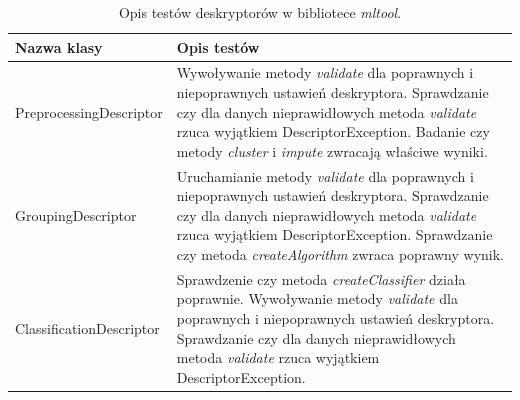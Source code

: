 \documentclass[../thesis.tex]{subfiles}
\begin{document}
\begin{table}[h]
\begin{center}
\begin{tabular}{ | l | p{110mm} | }
\hline
\rowcolor{lightgray} Nazwa klasy & Opis testów \\\hline

PreprocessingDescriptor & Wywoływanie metody \emph{validate} dla poprawnych i niepoprawnych ustawień deskryptora. Sprawdzanie czy dla danych nieprawidłowych metoda \emph{validate} rzuca wyjątkiem DescriptorException. Badanie czy metody \emph{cluster} i \emph{impute} zwracają właściwe wyniki.\\\hline
GroupingDescriptor & Uruchamianie metody \emph{validate} dla poprawnych i niepoprawnych ustawień deskryptora. Sprawdzanie czy dla danych nieprawidłowych metoda \emph{validate} rzuca wyjątkiem DescriptorException. Sprawdzanie czy metoda \emph{createAlgorithm} zwraca poprawny wynik.\\\hline
ClassificationDescriptor & Sprawdzenie czy metoda \emph{createClassifier} działa poprawnie. Wywoływanie metody \emph{validate} dla poprawnych i niepoprawnych ustawień deskryptora. Sprawdzanie czy dla danych nieprawidłowych metoda \emph{validate} rzuca wyjątkiem DescriptorException.\\\hline

\end{tabular}
\caption{Opis testów deskryptorów w bibliotece \emph{mltool}.}
\label{proj:table_mltool_descriptors}
\end{center}
\end{table}
\end{document}
